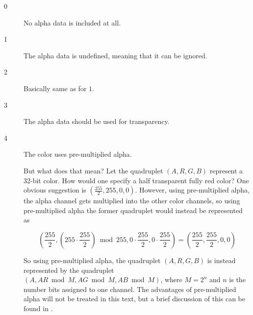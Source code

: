 \begin{description}
  \item[0] No alpha data is included at all.
  \item[1] The alpha data is undefined, meaning that it can be ignored.
  \item[2] Basically same as for $1$.
  \item[3] The alpha data should be used for transparency.
  \item[4] The color uses pre-multiplied alpha.

    But what does that mean? Let the quadruplet $(A,R,G,B)$ represent
    a 32-bit \argb color. How would one specify a half transparent
    fully red color? One obvious suggestion is
    $\left(\frac{255}{2},255,0,0\right)$. However, using
    pre-multiplied alpha, the alpha channel gets multiplied into the
    other color channels, so using pre-multiplied alpha the former
    quadruplet would instead be represented as

    \begin{equation*}
    \left(
    \frac{255}{2},
    \left(255 \cdot \frac{255}{2}\right) \bmod 255,
    0 \cdot \frac{255}{2},
    0 \cdot \frac{255}{2}\right)  =  \left(\frac{255}{2},\frac{255}{2}, 0, 0\right)
    \end{equation*}

    So using pre-multiplied alpha, the quadruplet $(A,R,G,B)$ is
    instead represented by the quadruplet $\left(A, AR \bmod M, AG
      \bmod M, AB \bmod M \right)$, where $M=2^n$ and $n$ is the
    number bits assigned to one channel. The advantages of
    pre-multiplied alpha will not be treated in this text, but a brief
    discussion of this can be found in \cite{porter84_compos_dig_img}.

\end{description}